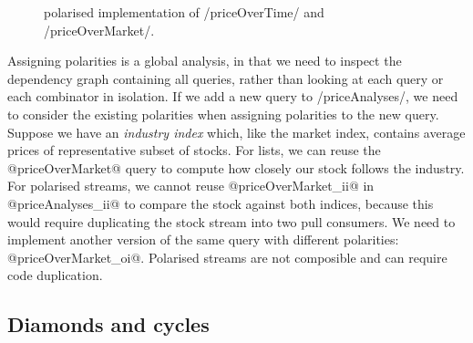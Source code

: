 \begin{figure}
\caption[Polarised implementation of priceOverTime and priceOverMarket]{polarised implementation of \Hs/priceOverTime/ and \Hs/priceOverMarket/.}
\label{figs/impl/polar/priceOverTime-priceOverMarket}
\end{figure}

Assigning polarities is a global analysis, in that we need to inspect the dependency graph containing all queries, rather than looking at each query or each combinator in isolation.
If we add a new query to \Hs/priceAnalyses/, we need to consider the existing polarities when assigning polarities to the new query.
Suppose we have an \emph{industry index} which, like the market index, contains average prices of representative subset of stocks.
For lists, we can reuse the @priceOverMarket@ query to compute how closely our stock follows the industry.
For polarised streams, we cannot reuse @priceOverMarket_ii@ in @priceAnalyses_ii@ to compare the stock against both indices, because this would require duplicating the stock stream into two pull consumers.
We need to implement another version of the same query with different polarities: @priceOverMarket_oi@.
Polarised streams are not composible and can require code duplication.

\subsection{Diamonds and cycles}

